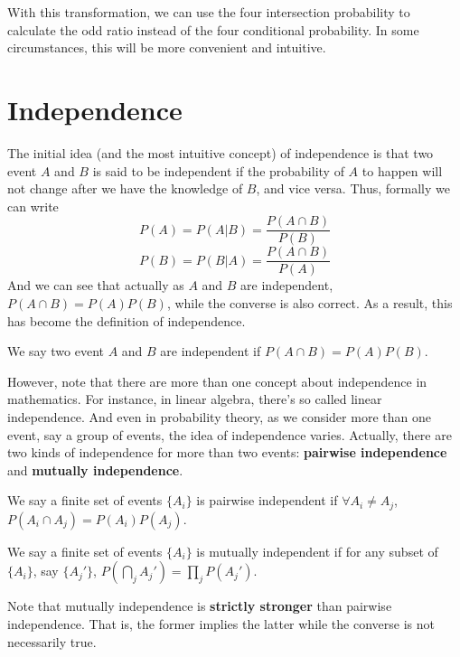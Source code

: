 \documentclass[11pt]{report}
\begin{document}
With this transformation, we can use the four intersection probability to calculate the odd ratio instead of the four conditional probability. In some circumstances, this will be more convenient and intuitive.

\section{Independence}
The initial idea (and the most intuitive concept) of independence is that two event $A$ and $B$ is said to be independent if the probability of $A$ to happen will not change after we have the knowledge of $B$, and vice versa. Thus, formally we can write
$$P(A) = P(A|B) = \frac{P(A\cap B)}{P(B)}$$
$$P(B) = P(B|A) = \frac{P(A\cap B)}{P(A)}$$
And we can see that actually as $A$ and $B$ are independent, $P(A\cap B) = P(A)P(B)$, while the converse is also correct. As a result, this has become the definition of independence.
\begin{definition}[independence]
	We say two event $A$ and $B$ are independent if $P(A\cap B) = P(A)P(B)$.
\end{definition}

However, note that there are more than one concept about independence in mathematics. For instance, in linear algebra, there's so called linear independence. And even in probability theory, as we consider more than one event, say a group of events, the idea of independence varies. Actually, there are two kinds of independence for more than two events: {\bf pairwise independence} and {\bf mutually independence}.

\begin{definition}
	We say a finite set of events $\{A_i\}$ is pairwise independent if $\forall A_i\neq A_j$, $P(A_i\cap A_j) = P(A_i)P(A_j)$.
\end{definition}
\begin{definition}
	We say a finite set of events $\{A_i\}$ is mutually independent if for any subset of $\{A_i\}$, say $\{A_j'\}$, $P(\bigcap_{j}A_j')=\prod_{j}P(A_j')$.
\end{definition}

Note that mutually independence is {\bf strictly stronger} than pairwise independence. That is, the former implies the latter while the converse is not necessarily true.
\end{document}
